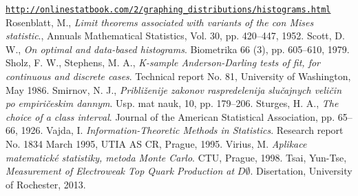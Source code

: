 \begin{thebibliography}{10}
\href{http://onlinestatbook.com/2/graphing_distributions/histograms.html}{\texttt{http://onlinestatbook.com/2/graphing\_distributions/histograms.html}}
 Rosenblatt, M., {\em Limit theorems associated with variants of the con Mises statistic}., Annuals Mathematical Statistics, Vol. 30, pp. 420--447, 1952.
 Scott, D. W., {\em On optimal and data-based histograms}. Biometrika 66 (3), pp. 605–610, 1979.
 Sholz, F. W., Stephens, M. A., {\em K-sample Anderson-Darling tests of fit, for continuous and discrete cases}. Technical report No. 81, University of Washington, May 1986.
Smirnov, N. J., {\em Pribli\v{z}enije zakonov raspredelenija slu\v{c}ajnych veli\v{c}in po empiri\v{c}eskim dannym}. Usp. mat nauk, 10, pp. 179--206.
 Sturges, H. A., {\em The choice of a class interval}. Journal of the American Statistical Association, pp. 65--66, 1926.
Vajda, I. {\em Information-Theoretic Methods in Statistics}. Research report No. 1834 March 1995, UTIA AS CR, Prague, 1995.
Virius, M. {\em Aplikace matematick\'e statistiky, metoda Monte Carlo}. CTU, Prague, 1998.
Tsai, Yun-Tse, {\em Measurement of Electroweak Top Quark Production at} $D\mathit{\emptyset}$. Disertation, University of Rochester, 2013.
\end{thebibliography}